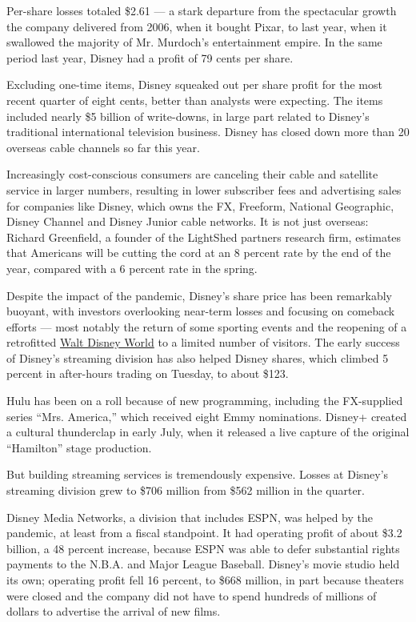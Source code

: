 Per-share losses totaled \$2.61 --- a stark departure from the
spectacular growth the company delivered from 2006, when it bought
Pixar, to last year, when it swallowed the majority of Mr. Murdoch's
entertainment empire. In the same period last year, Disney had a profit
of 79 cents per share.

Excluding one-time items, Disney squeaked out per share profit for the
most recent quarter of eight cents, better than analysts were expecting.
The items included nearly \$5 billion of write-downs, in large part
related to Disney's traditional international television business.
Disney has closed down more than 20 overseas cable channels so far this
year.

Increasingly cost-conscious consumers are canceling their cable and
satellite service in larger numbers, resulting in lower subscriber fees
and advertising sales for companies like Disney, which owns the FX,
Freeform, National Geographic, Disney Channel and Disney Junior cable
networks. It is not just overseas: Richard Greenfield, a founder of the
LightShed partners research firm, estimates that Americans will be
cutting the cord at an 8 percent rate by the end of the year, compared
with a 6 percent rate in the spring.

Despite the impact of the pandemic, Disney's share price has been
remarkably buoyant, with investors overlooking near-term losses and
focusing on comeback efforts --- most notably the return of some
sporting events and the reopening of a retrofitted
\href{https://www.nytimes.com/2020/07/11/business/florida-coronavirus-disney-world-reopening.html}{Walt
Disney World} to a limited number of visitors. The early success of
Disney's streaming division has also helped Disney shares, which climbed
5 percent in after-hours trading on Tuesday, to about \$123.

Hulu has been on a roll because of new programming, including the
FX-supplied series ``Mrs. America,'' which received eight Emmy
nominations. Disney+ created a cultural thunderclap in early July, when
it released a live capture of the original ``Hamilton'' stage
production.

But building streaming services is tremendously expensive. Losses at
Disney's streaming division grew to \$706 million from \$562 million in
the quarter.

Disney Media Networks, a division that includes ESPN, was helped by the
pandemic, at least from a fiscal standpoint. It had operating profit of
about \$3.2 billion, a 48 percent increase, because ESPN was able to
defer substantial rights payments to the N.B.A. and Major League
Baseball. Disney's movie studio held its own; operating profit fell 16
percent, to \$668 million, in part because theaters were closed and the
company did not have to spend hundreds of millions of dollars to
advertise the arrival of new films.

